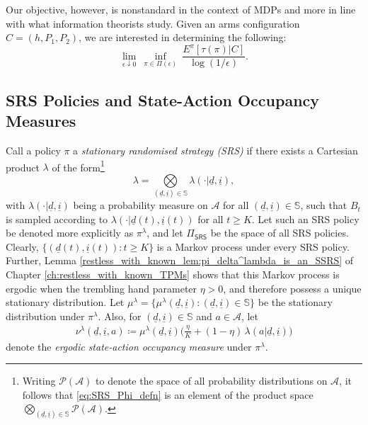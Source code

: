 Our objective, however, is nonstandard in the context of MDPs and more in line with what information theorists study. Given an arms configuration $C=(h, P_1, P_2)$, we are interested in determining the following:
\begin{equation}
  \lim_{\epsilon \downarrow 0} ~ \inf_{\pi \in \Pi(\epsilon)} ~ \frac{E^\pi [\tau(\pi)|C]}{\log (1/\epsilon)}.
  \label{eq:main_quantity}
\end{equation}

\subsection{SRS Policies and State-Action Occupancy Measures}
Call a policy $\pi$ a {\em stationary randomised strategy (SRS)} if there exists a Cartesian product $\lambda$ of the form\footnote{Writing $\mathcal{P}(
	\mathcal{A})$ to denote the space of all probability distributions on $\mathcal{A}$, it follows that  \eqref{eq:SRS_Phi_defn} is an element of the product space $\bigotimes \limits_{(\underline{d},\underline{i})\in\mathbb{S}} \mathcal{P}(\mathcal{A})$.}
\begin{equation}
	\lambda=\bigotimes \limits_{(\underline{d},\underline{i})\in\mathbb{S}} \lambda(\cdot|\underline{d}, \underline{i}),\label{eq:SRS_Phi_defn}
\end{equation}
with $\lambda(\cdot|\underline{d}, \underline{i})$ being a probability measure on $\mathcal{A}$ for all $(\underline{d}, \underline{i})\in \mathbb{S}$, such that $B_{t}$ is sampled according to $\lambda(\cdot|\underline{d}(t), \underline{i}(t))$ for all $t\geq K$. Let such an SRS policy be denoted more explicitly as $\pi^\lambda$, and let $\Pi_{\textsf{SRS}}$ be the space of all SRS policies. Clearly, $\{(\underline{d}(t), \underline{i}(t)):t\geq K\}$ is a Markov process under every SRS policy. Further, Lemma \ref{restless_with_known_lem:pi_delta^lambda_is_an_SSRS} of Chapter \ref{ch:restless_with_known_TPMs} shows that this Markov process is ergodic when the trembling hand parameter $\eta>0$, and therefore possess a unique stationary distribution. Let $\mu^\lambda=\{\mu^\lambda(\underline{d}, \underline{i}): (\underline{d}, \underline{i})\in \mathbb{S}\}$ be the stationary distribution under $\pi^\lambda$. Also, for $(\underline{d},\underline{i})\in \mathbb{S}$ and $a\in \mathcal{A}$, let
\begin{eqnarray}
		\nu^\lambda(\underline{d},\underline{i},a)\coloneqq \mu^\lambda(\underline{d},\underline{i})\bigg(\frac{\eta}{K}+(1-\eta)\,\lambda(a|\underline{d},\underline{i})\bigg)\label{eq:ergodic_state_action_occupancy_measure}
	\end{eqnarray}
denote the {\em ergodic state-action occupancy measure} under $\pi^\lambda$.

